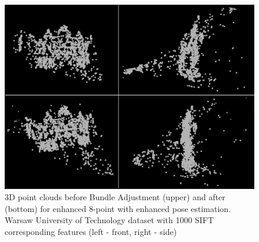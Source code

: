 \begin{figure}[h!]
    \centering
    \includegraphics[width=\textwidth]{bundleAdjustmentComparison}
    \caption[3D point clouds before and after Bundle Adjustment for enhanced 8-point with enhanced pose estimation]{3D point clouds before Bundle Adjustment (upper) and after (bottom) for enhanced 8-point with enhanced pose estimation. Warsaw University of Technology dataset with 1000 SIFT corresponding features (left - front, right - side)}
    \label{fig:BundleAdjustmentComparison}
\end{figure}
\clearpage

